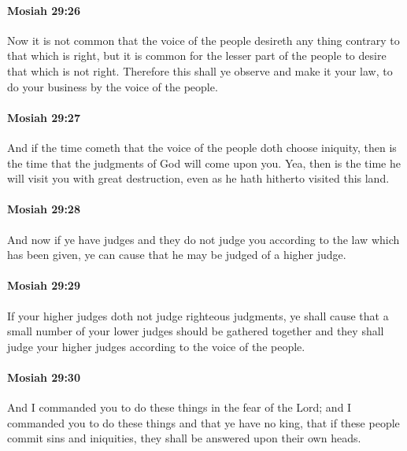 		\paragraph{Mosiah 29:26} %
			\label{MOSIAH-29-26}

			Now it is not common that the voice of the people desireth any thing
			contrary to that which is right,
			but it is common for the lesser part of the people
			to desire that which is not right.
			Therefore this shall ye observe and make it your law,
			to do your business by the voice of the people.

		\paragraph{Mosiah 29:27} %
			\label{MOSIAH-29-27}

			And if the time cometh that the voice of the people doth choose iniquity,
			then is the time that the judgments of God will come upon you.
			Yea, then is the time he will visit you with great destruction,
			even as he hath hitherto visited this land.

		\paragraph{Mosiah 29:28} %
			\label{MOSIAH-29-28}

			And now if ye have judges
			and they do not judge you according to the law which has been given,
			ye can cause that he may be judged of a higher judge.

		\paragraph{Mosiah 29:29} %
			\label{MOSIAH-29-29}

			If your higher judges doth not judge righteous judgments,
			ye shall cause that a small number of your lower judges
			should be gathered together
			and they shall judge your higher judges
			according to the voice of the people.

		\paragraph{Mosiah 29:30} %
			\label{MOSIAH-29-30}

			And I commanded you to do these things in the fear of the Lord;
			and I commanded you to do these things and that ye have no king,
			that if these people commit sins and iniquities,
			they shall be answered upon their own heads.

